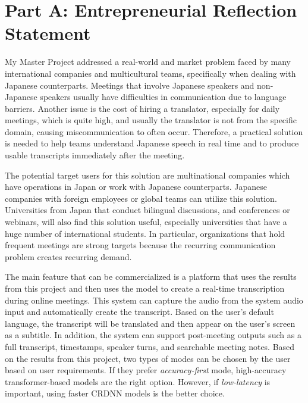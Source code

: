 \pagebreak
\section*{Part A: Entrepreneurial Reflection Statement}

My Master Project addressed a real-world and market problem faced by many international companies and multicultural teams, specifically when dealing with Japanese counterparts. Meetings that involve Japanese speakers and non-Japanese speakers usually have difficulties in communication due to language barriers. Another issue is the cost of hiring a translator, especially for daily meetings, which is quite high, and usually the translator is not from the specific domain, causing miscommunication to often occur. Therefore, a practical solution is needed to help teams understand Japanese speech in real time and to produce usable transcripts immediately after the meeting.

The potential target users for this solution are multinational companies which have operations in Japan or work with Japanese counterparts. Japanese companies with foreign employees or global teams can utilize this solution. Universities from Japan that conduct bilingual discussions, and conferences or webinars, will also find this solution useful, especially universities that have a huge number of international students. In particular, organizations that hold frequent meetings are strong targets because the recurring communication problem creates recurring demand.

The main feature that can be commercialized is a platform that uses the results from this project and then uses the model to create a real-time transcription during online meetings. This system can capture the audio from the system audio input and automatically create the transcript. Based on the user's default language, the transcript will be translated and then appear on the user's screen as a subtitle. In addition, the system can support post-meeting outputs such as a full transcript, timestamps, speaker turns, and searchable meeting notes. Based on the results from this project, two types of modes can be chosen by the user based on user requirements. If they prefer \textit{accuracy-first} mode, high-accuracy transformer-based models are the right option. However, if \textit{low-latency} is important, using faster CRDNN models is the better choice.



